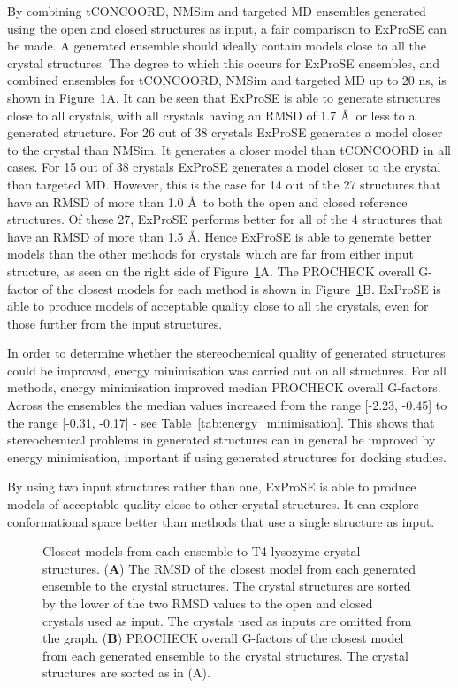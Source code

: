 By combining tCONCOORD, NMSim and targeted MD ensembles generated using the open and closed structures as input, a fair comparison to ExProSE can be made.
A generated ensemble should ideally contain models close to all the crystal structures.
The degree to which this occurs for ExProSE ensembles, and combined ensembles for tCONCOORD, NMSim and targeted MD up to 20 ns, is shown in Figure~\ref{fig:t4l_rmsd}A.
It can be seen that ExProSE is able to generate structures close to all crystals, with all crystals having an RMSD of 1.7 \AA\ or less to a generated structure.
For 26 out of 38 crystals ExProSE generates a model closer to the crystal than NMSim.
It generates a closer model than tCONCOORD in all cases.
For 15 out of 38 crystals ExProSE generates a model closer to the crystal than targeted MD.
However, this is the case for 14 out of the 27 structures that have an RMSD of more than 1.0 \AA\ to both the open and closed reference structures.
Of these 27, ExProSE performs better for all of the 4 structures that have an RMSD of more than 1.5 \AA.
Hence ExProSE is able to generate better models than the other methods for crystals which are far from either input structure, as seen on the right side of Figure~\ref{fig:t4l_rmsd}A.
The PROCHECK overall G-factor of the closest models for each method is shown in Figure~\ref{fig:t4l_rmsd}B.
ExProSE is able to produce models of acceptable quality close to all the crystals, even for those further from the input structures.

In order to determine whether the stereochemical quality of generated structures could be improved, energy minimisation was carried out on all structures.
For all methods, energy minimisation improved median PROCHECK overall G-factors.
Across the ensembles the median values increased from the range [-2.23, -0.45] to the range [-0.31, -0.17] - see Table~\ref{tab:energy_minimisation}.
This shows that stereochemical problems in generated structures can in general be improved by energy minimisation, important if using generated structures for docking studies.

By using two input structures rather than one, ExProSE is able to produce models of acceptable quality close to other crystal structures.
It can explore conformational space better than methods that use a single structure as input.


\begin{figure}
\centering


\caption{Closest models from each ensemble to T4-lysozyme crystal structures.
(\textbf{A}) The RMSD of the closest model from each generated ensemble to the crystal structures.
The crystal structures are sorted by the lower of the two RMSD values to the open and closed crystals used as input.
The crystals used as inputs are omitted from the graph.
(\textbf{B}) PROCHECK overall G-factors of the closest model from each generated ensemble to the crystal structures.
The crystal structures are sorted as in (A).}

\label{fig:t4l_rmsd}
\end{figure}


